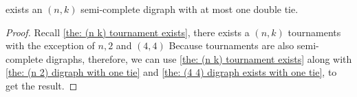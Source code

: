   \begin{theorem}
    exists an \((n, k)\) semi-complete digraph with
    at most one double tie.
  \end{theorem}

  \begin{proof}
    Recall \cref{the: (n k) tournament exists},
    there exists a \((n, k)\) tournaments
    with the exception of \(n, 2\) and \((4, 4)\)
    Because tournaments are also semi-complete digraphs,
    therefore, we can use \cref{the: (n k) tournament exists}
    along with \cref{the: (n 2) digraph with one tie}
    and \cref{the: (4 4) digraph exists with one tie},
    to get the result.
  \end{proof}


